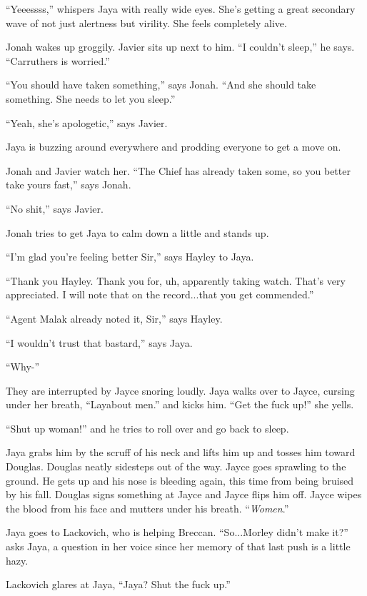 ``Yeeessss,'' whispers Jaya with really wide eyes.  She's getting a great secondary wave of not just alertness but virility.  She feels completely alive.



Jonah wakes up groggily.  Javier sits up next to him.  ``I couldn't sleep,'' he says.  ``Carruthers is worried.''

``You should have taken something,'' says Jonah.  ``And she should take something.  She needs to let you sleep.''

``Yeah, she's apologetic,'' says Javier.

Jaya is buzzing around everywhere and prodding everyone to get a move on.

Jonah and Javier watch her.  ``The Chief has already taken some, so you better take yours fast,'' says Jonah.

``No shit,'' says Javier.  

Jonah tries to get Jaya to calm down a little and stands up.

``I'm glad you're feeling better Sir,'' says Hayley to Jaya.

``Thank you Hayley. Thank you for, uh, apparently taking watch.  That's very appreciated.  I will note that on the record...that you get commended.''

``Agent Malak already noted it, Sir,'' says Hayley.

``I wouldn't trust that bastard,'' says Jaya.

``Why-''

They are interrupted by Jayce snoring loudly.  Jaya walks over to Jayce, cursing under her breath, ``Layabout men.'' and kicks him.  ``Get the fuck up!'' she yells.

``Shut up woman!'' and he tries to roll over and go back to sleep.

Jaya grabs him by the scruff of his neck and lifts him up and tosses him toward Douglas.  Douglas neatly sidesteps out of the way.  Jayce goes sprawling to the ground.  He gets up and his nose is bleeding again, this time from being bruised by his fall.  Douglas signs something at Jayce and Jayce flips him off.  Jayce wipes the blood from his face and mutters under his breath.  ``\textit{Women}.''



Jaya goes to Lackovich, who is helping Breccan.  ``So...Morley didn't make it?'' asks Jaya, a question in her voice since her memory of that last push is a little hazy.

Lackovich glares at Jaya, ``Jaya?  Shut the fuck up.''

